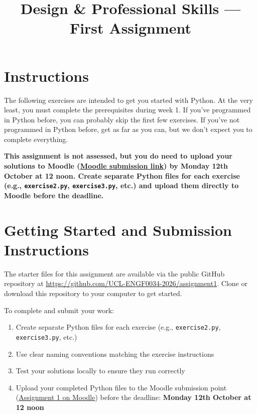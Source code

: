 \documentclass{article}
\title{Design \& Professional Skills --- First Assignment}
\author{}
\date{}
\begin{document}
\maketitle

\section*{Instructions}

The following exercises are intended to get you started with
Python.  At the very least, you must complete the prerequisites during
week 1.  If you've programmed in Python before, you can probably skip
the first few exercises.  If you've not programmed in Python before,
get as far as you can, but we don't expect you to complete everything.

\textbf{This assignment is not assessed, but you do need to upload your solutions to Moodle (\href{https://moodle.ucl.ac.uk/mod/assign/view.php?id=9108695}{Moodle submission link}) by Monday 12th October at 12 noon. Create separate Python files for each exercise (e.g., \texttt{exercise2.py}, \texttt{exercise3.py}, etc.) and upload them directly to Moodle before the deadline.}

\section*{Getting Started and Submission Instructions}

The starter files for this assignment are available via the public GitHub repository at \url{https://github.com/UCL-ENGF0034-2026/assignment1}. Clone or download this repository to your computer to get started.

To complete and submit your work:

\begin{enumerate}
\item Create separate Python files for each exercise (e.g., \texttt{exercise2.py}, \texttt{exercise3.py}, etc.)
\item Use clear naming conventions matching the exercise instructions
\item Test your solutions locally to ensure they run correctly
\item Upload your completed Python files to the Moodle submission point (\href{https://moodle.ucl.ac.uk/mod/assign/view.php?id=9108695}{Assignment 1 on Moodle}) before the deadline: \textbf{Monday 12th October at 12 noon}
\end{enumerate}
\end{document}
